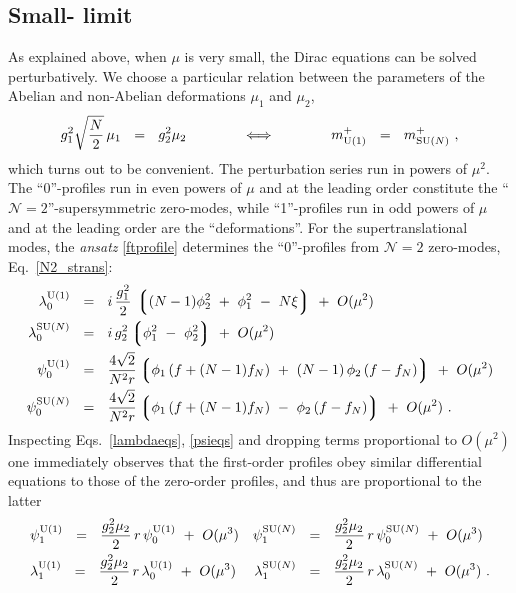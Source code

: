 \documentclass[12pt]{article}
\def\beq{\begin{equation}}
\def\eeq{\end{equation}}
\newcommand{\ntwo}{${\mathcal N}=2$ }
\newcommand{\ntwon}{${\mathcal N}=2$}
\newcommand{\lgr}{\left\lgroup}
\newcommand{\rgr}{\right\rgroup}
\newcommand{\mUp}{m_{\rm U(1)}^{+}}
\newcommand{\mNp}{m_\text{SU($N$)}^{+}}
\newcommand{\loU}{\lambda_0^{\rm U(1)}}
\newcommand{\llU}{\lambda_1^{\rm U(1)}}
\newcommand{\loN}{\lambda_0^\text{SU($N$)}}
\newcommand{\llN}{\lambda_1^\text{SU($N$)}}
\newcommand{\poU}{\psi_0^{\rm U(1)}}
\newcommand{\plU}{\psi_1^{\rm U(1)}}
\newcommand{\poN}{\psi_0^\text{SU($N$)}}
\newcommand{\plN}{\psi_1^\text{SU($N$)}}
\begin{document}
\subsection{Small-\boldmath{$\mu$} limit}
As explained above, when $ \mu $ is very small, the Dirac equations can be solved perturbatively. 
We choose a particular relation between the parameters of the Abelian and non-Abelian deformations $ \mu_1 $ 
and $ \mu_2 $,
\beq
\label{mueq}
	g_1^2 \sqrt{\frac{N}{2}}\, \mu_1 ~~=~~ g_2^2 \mu_2  \qquad\qquad \Longleftrightarrow \qquad\qquad 
		\mUp  ~~=~~ \mNp~,
\eeq
which turns out to be convenient.
The perturbation series run in powers of $ \mu^2 $.
The ``0''-profiles run in even powers of $ \mu $ and at the leading order constitute the ``\ntwon''-supersymmetric zero-modes, 
while ``1''-profiles run in odd powers of $ \mu $ and at the leading order are the ``deformations''.
For the supertranslational modes, the {\it ansatz} \eqref{ftprofile} determines the ``0''-profiles
from \ntwo zero-modes, Eq.~\eqref{N2_strans}:
\begin{align}
%
\notag
	\loU & ~~=~~ i\, \frac{g_1^2}{2}\, \lgr (N-1) \phi_2^2 ~+~ \phi_1^2 ~-~ N\xi \rgr  ~+~ O(\mu^2) 
	\\
%
\notag
	\loN & ~~=~~ i\, g_2^2 \lgr \phi_1^2 ~-~ \phi_2^2 \rgr ~+~ O(\mu^2)
	\\
%
\label{tzeroorder}
	\poU & ~~=~~ \frac{4\sqrt{2}}{N^2 r} \lgr \phi_1\, (f + (N-1) f_N) ~+~ (N-1)\, \phi_2\, (f-f_N) \rgr ~+~ O(\mu^2)
	\\
%
\notag
	\poN & ~~=~~ \frac{4\sqrt{2}}{N^2 r} \lgr \phi_1\, (f + (N-1) f_N) ~-~ \phi_2\, (f-f_N) \rgr ~+~ O(\mu^2)
	~.
\end{align}
	Inspecting Eqs.~\eqref{lambdaeqs}, \eqref{psieqs} and dropping terms proportional to $ O(\mu^2) $ one 
	immediately observes that the first-order profiles obey similar differential equations to those of the zero-order 
	profiles, and thus are proportional to the latter
\begin{align}
%
\notag
	& \plU ~~=~~ \frac{g_2^2\mu_2}{2}\, r \, \poU ~+~ O(\mu^3)		& \plN &~~=~~ \frac{g_2^2\mu_2}{2}\, r\, \poN ~+~ O(\mu^3)  
	\\
%
\label{tfirstorder}
	& \llU ~~=~~ \frac{g_2^2\mu_2}{2}\, r \, \loU ~+~ O(\mu^3)		& \llN &~~=~~ \frac{g_2^2\mu_2}{2}\, r\, \loN ~+~ O(\mu^3)~.
\end{align}
\end{document}
